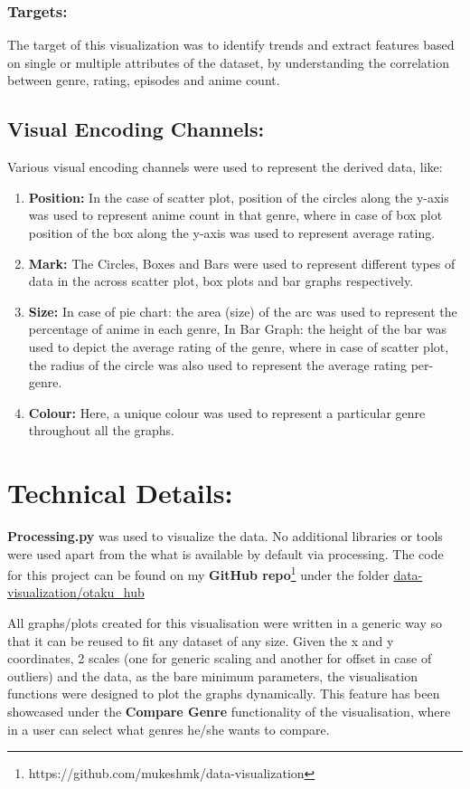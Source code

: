 \documentclass[a4paper, 10pt]{article}
\begin{document}
    \subsubsection{Targets:}
    \qquad The target of this visualization was to identify trends and extract features based on single or multiple attributes of the dataset, by understanding the correlation between genre, rating, episodes and anime count.
    \subsection{Visual Encoding Channels:}
    \qquad Various visual encoding channels were used to represent the derived data, like:
    \begin{enumerate}
        \item \textbf{Position:} In the case of scatter plot, position of the circles along the y-axis was used to represent anime count in that genre, where in case of box plot position of the box along the y-axis was used to represent average rating.
        \item \textbf{Mark:} The Circles, Boxes and Bars were used to represent different types of data in the across scatter plot, box plots and bar graphs respectively.
        \item \textbf{Size:} In case of pie chart: the area (size) of the arc was used to represent the percentage of anime in each genre, In Bar Graph: the height of the bar was used to depict the average rating of the genre, where in case of scatter plot, the radius of the circle was also used to represent the average rating per-genre.
        \item \textbf{Colour:} Here, a unique colour was used to represent a particular genre throughout all the graphs.
    \end{enumerate}
\section{Technical Details:}
\qquad \textbf{Processing.py} was used to visualize the data. No additional libraries or tools were used apart from the what is available by default via processing. The code for this project can be found on my \textbf{GitHub repo}\footnote{https://github.com/mukeshmk/data-visualization} under the folder \href{https://github.com/mukeshmk/data-visualization/tree/master/otaku_hub}{data-visualization/otaku\_hub}

\qquad All graphs/plots created for this visualisation were written in a generic way so that it can be reused to fit any dataset of any size. Given the x and y coordinates, 2 scales (one for generic scaling and another for offset in case of outliers) and the data, as the bare minimum parameters, the visualisation functions were designed to plot the graphs dynamically. This feature has been showcased under the \textbf{Compare Genre} functionality of the visualisation, where in a user can select what genres he/she wants to compare.
\end{document}
